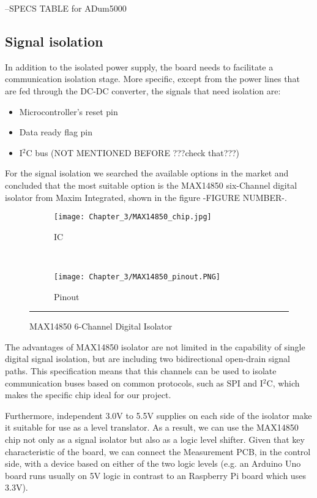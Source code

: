 --SPECS TABLE for ADum5000\\

\subsection{Signal isolation}
In addition to the isolated power supply, the board needs to facilitate a communication isolation stage. More specific, except from the power lines that are fed through the DC-DC converter, the signals that need isolation are:

\begin{itemize}
    \item Microcontroller's reset pin
    \item Data ready flag pin
    \item I$^2$C bus (NOT MENTIONED BEFORE ???check that???)
\end{itemize}

For the signal isolation we searched the available options in the market and concluded that the most suitable option is the MAX14850 six-Channel digital isolator from Maxim Integrated, shown in the figure -FIGURE NUMBER-.\\

\begin{figure}[htbp]
	\centering
	\begin{subfigure}[b]{.3\textwidth}
		\texttt{[image: Chapter\_3/MAX14850\_chip.jpg]}
	    \caption[]{IC}
	    \label{fig:MAX14850_chip}
	\end{subfigure}
    ~
	\begin{subfigure}[b]{.3\textwidth}
		\texttt{[image: Chapter\_3/MAX14850\_pinout.PNG]}
	    \caption[]{Pinout}
	    \label{fig:MAX14850_pinout}
	\end{subfigure}
	\rule{35em}{0.5pt}
	\caption{MAX14850 6-Channel Digital Isolator}
	\label{fig:MAX14850}
\end{figure}

The advantages of MAX14850 isolator are not limited in the capability of single digital signal isolation, but are including two bidirectional open-drain signal paths. This specification means that this channels can be used to isolate communication buses based on common protocols, such as SPI and I$^2$C, which makes the specific chip ideal for our project.

Furthermore, independent 3.0V to 5.5V supplies on each side of the isolator make it suitable for use as a level translator. As a result, we can use the MAX14850 chip not only as a signal isolator but also as a logic level shifter. Given that key characteristic of the board, we can connect the Measurement PCB, in the control side, with a device based on either of the two logic levels (e.g. an Arduino Uno board runs usually on 5V logic in contrast to an Raspberry Pi board which uses 3.3V).

